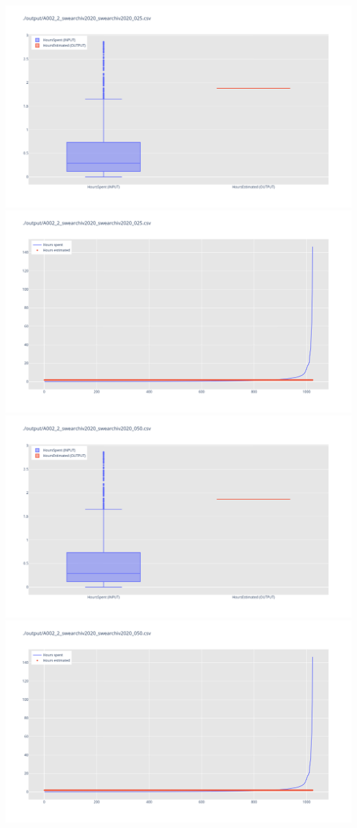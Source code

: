 \includegraphics[width=\textwidth]{Scripts/output/A002_2_swearchiv2020_swearchiv2020_025.csv.png}
\includegraphics[width=\textwidth]{Scripts/output/A002_2_swearchiv2020_swearchiv2020_025.csv.scatter.png}
\includegraphics[width=\textwidth]{Scripts/output/A002_2_swearchiv2020_swearchiv2020_050.csv.png}
\includegraphics[width=\textwidth]{Scripts/output/A002_2_swearchiv2020_swearchiv2020_050.csv.scatter.png}
